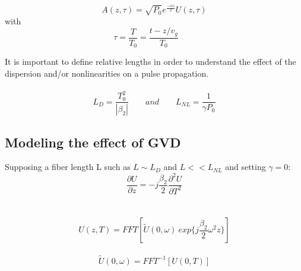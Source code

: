         
  
            \begin{equation}\label{eq_A0}
                A(z,\tau ) = \sqrt{P_0}e^{\frac{-\alpha z}{2}} U(z,\tau)
            \end{equation}
            with
            \begin{equation}
                \tau =  \frac{T}{T_0} = \frac{t-z/v_g}{T_0} \qquad
            \end{equation}
        
        It is important to define relative lengths in order to understand the effect of the dispersion and/or nonlinearities on a pulse propagation.
            \ \\
            \ \\
            \begin{equation}
                L_D = \frac{T^2_0}{|\beta_2|} \qquad and \qquad L_{NL} = \frac{1}{\gamma P_0}
            \end{equation}
 
        
        \subsection{Modeling the effect of GVD}
        
        Supposing a fiber length L such as $L \sim L_D$ and $L << L_{NL}$ and setting $\gamma = 0$: 
            \begin{equation}
                \frac{\partial U}{\partial z} = -j\frac{\beta_2}{2}\frac{\partial^2U}{\partial T^2}
            \end{equation}
            \ \\
            \ \\
            \begin{equation}
                U(z,T) = FFT \left[ \widetilde{U}(0,\omega) \ exp\{j\frac{\beta_2}{2}\omega^2z\} \right]
            \end{equation}
            \ \\
            \begin{equation}
                \widetilde{U}(0,\omega)  = FFT^{-1} \left[ U(0,T)\right]
            \end{equation}
        
